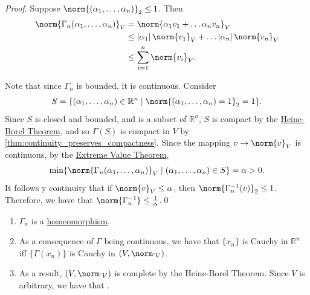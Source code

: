 \documentclass[notoc,notitlepage]{tufte-book}
\begin{document}
\begin{proof}
   Suppose $\norm{ (\alpha_1, \ldots, \alpha_n) }_2 \leq 1$. Then
  \begin{align*}
    \norm{ \Gamma_n(\alpha_1, \ldots, \alpha_n) }_V &= \norm{ \alpha_1 v_1 + \hdots \alpha_n v_n }_V \\
                                                    &\leq \abs{ \alpha_1 } \norm{v_1}_V + \hdots \abs{ \alpha_n } \norm{v_n}_V \\
                                                    &\leq \sum_{i=1}^{n} \norm{ v_i }_V.
  \end{align*}

  \noindent
   Note that since $\Gamma_n$ is bounded, it is continuous. Consider
  \begin{equation*}
    S = \{ (\alpha_1, \ldots, \alpha_n) \in \mathbb{R}^n \mid \norm{ (\alpha_1, \ldots, \alpha_n) = 1 }_2 = 1 \}.
  \end{equation*}
  Since $S$ is closed and bounded, and is a subset of $\mathbb{R}^n$, $S$ is compact by the \hyperref[thm:heine_borel_theorem]{Heine-Borel Theorem}, and so $\Gamma(S)$ is compact in $V$ by \cref{thm:continuity_preserves_compactness}. Since the mapping $v \to \norm{v}_V$ is continuous, by the \hyperref[crly:extreme_value_theorem]{Extreme Value Theorem},
  \begin{equation*}
    \min \{ \norm{ \Gamma_n(\alpha_1, \ldots, \alpha_n) }_V \mid (\alpha_1, \ldots, \alpha_n) \in S \} = \alpha > 0.
  \end{equation*}
It follows y continuity that if $\norm{v}_V \leq \alpha$, then $\norm{\Gamma_n^{-1}(v)}_2 \leq 1$. Therefore, we have that $\norm{\Gamma_n^{-1}} \leq \frac{1}{\alpha}$.\qed\
\end{proof}

\begin{note}
  \begin{enumerate}
    \item $\Gamma_n$ is a \hyperref[defn:homeomorphism]{homeomorphism}.
    \item As a consequence of $\Gamma$ being continuous, we have that $\{ x_n \}$ is Cauchy in $\mathbb{R}^n$ iff $\{ \Gamma(x_n) \}$ is Cauchy in $(V, \norm\cdot_V)$.
    \item As a result, $(V, \norm\cdot_V)$ is complete by the Heine-Borel Theorem. Since $V$ is arbitrary, we have that .
  \end{enumerate}
\end{note}
\end{document}
